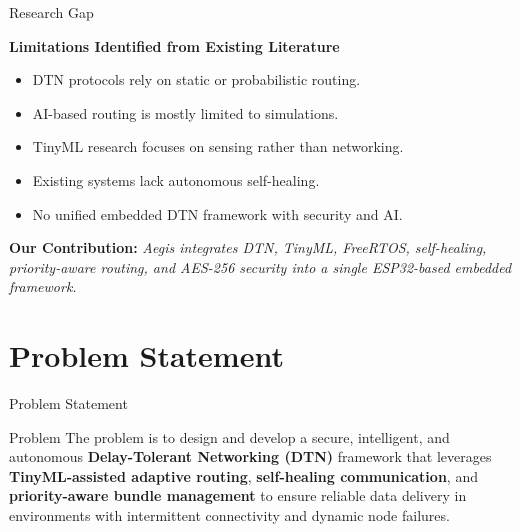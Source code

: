 \documentclass[11pt,aspectratio=43]{beamer}
\begin{document}
\begin{frame}{Research Gap}

\textbf{Limitations Identified from Existing Literature}

\vspace{0.2cm}

\begin{itemize}
    \item DTN protocols rely on static or probabilistic routing.
    \item AI-based routing is mostly limited to simulations.
    \item TinyML research focuses on sensing rather than networking.
    \item Existing systems lack autonomous self-healing.
    \item No unified embedded DTN framework with security and AI.
\end{itemize}

\vspace{0.3cm}

\textbf{Our Contribution:} \textit{Aegis integrates DTN, TinyML, FreeRTOS, self-healing, priority-aware routing, and AES-256 security into a single ESP32-based embedded framework.}

\end{frame}
\section{Problem Statement}

\begin{frame}{Problem Statement}

\vfill

\begin{block}{Problem}
\centering
The problem is to design and develop a secure, intelligent, and autonomous \textbf{Delay-Tolerant Networking (DTN)} framework that leverages \textbf{TinyML-assisted adaptive routing}, \textbf{self-healing communication}, and \textbf{priority-aware bundle management} to ensure reliable data delivery in environments with intermittent connectivity and dynamic node failures.
\end{block}

\vfill

\end{frame}
\end{document}
